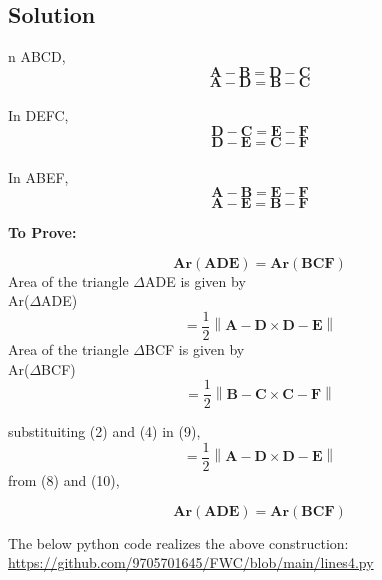 \documentclass[10pt,a4paper]{report}
\let\vec\mathbf
\providecommand{\norm}[1]{\left\lVert#1\right\rVert}
\let\vec\mathbf
\begin{document}
\begin{multicols}{2}
 \section{Solution}
n ABCD,
\begin{equation}
\vec{A-B}=\vec{D-C}
\end{equation}
\begin{equation}
\vec{A-D}=\vec{B-C}
\end{equation}
\\
In DEFC,
\begin{equation}
\vec{D-C}=\vec{E-F}
\end{equation}
\begin{equation}
\vec{D-E}=\vec{C-F}
\end{equation}
\\
In ABEF,
\begin{equation}
\vec{A-B}=\vec{E-F}
\end{equation}
\begin{equation}
\vec{A-E}=\vec{B-F}
\end{equation}

\vspace{1mm}

\textbf{To Prove:} 
  \begin{center}
  \begin{equation}
      \vec{Ar(ADE)=Ar(BCF)}
  \end{equation}
 \vspace{3mm}
 Area of the triangle $\Delta$ADE is given by \\
 Ar($\Delta$ADE) 
\begin{equation} 
 = \frac{1}{2}\norm{\vec{A-D}\times\vec{D-E}}
\end{equation}
 \vspace{3mm}
  Area of the triangle $\Delta$BCF is given by \\
  Ar($\Delta$BCF)
   \begin{equation}
   =\frac{1}{2}\norm{\vec{B-C}\times\vec{C-F}}
   \end{equation}
 \end{center}
 substituiting (2) and (4) in (9),
 \begin{equation}
   =\frac{1}{2}\norm{\vec{A-D}\times\vec{D-E}}
   \end{equation}
   from (8) and (10),
 \begin{center}
\begin{equation}
    \vec{Ar(ADE)=Ar(BCF)}
\end{equation}
\end{center}
The below python code realizes the above construction: \\
\url{https://github.com/9705701645/FWC/blob/main/lines4.py}

\end{multicols}
\end{document}
